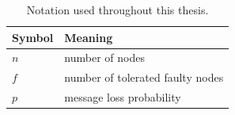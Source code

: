 \begin{table}[htbp]
  \centering
  \caption{Notation used throughout this thesis.}
  \label{tab:notation}
  \begin{tabular}{ll}
    \toprule
    Symbol & Meaning \\
    \midrule
    $n$ & number of nodes \\
    $f$ & number of tolerated faulty nodes \\
    $p$ & message loss probability \\
    \bottomrule
  \end{tabular}
\end{table}
